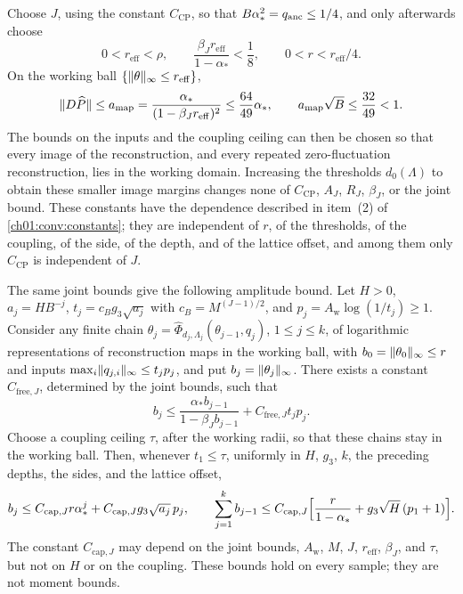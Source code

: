 \begin{lemma}
Choose $J$, using the constant $C_{\mathrm{CP}}$, so that $B\alpha_*^2=q_{\mathrm{anc}}\le1/4$, and only afterwards choose
\[
 0<r_{\mathrm{eff}}<\rho,\qquad \frac{\beta_Jr_{\mathrm{eff}}}{1-\alpha_*}<\frac18,\qquad 0<r<r_{\mathrm{eff}}/4 .
\]
On the working ball $\{\lVert \theta\rVert_\infty\le r_{\mathrm{eff}}\}$,
\[
 \lVert D\widehat P\rVert\le a_{\mathrm{map}}=\frac{\alpha_*}{(1-\beta_Jr_{\mathrm{eff}})^2}\le\frac{64}{49}\alpha_*,\qquad
 a_{\mathrm{map}}\sqrt B\le\frac{32}{49}<1 .
\]
The bounds on the inputs and the coupling ceiling can then be chosen so that every image of the reconstruction, and every repeated zero-fluctuation reconstruction, lies in the working domain. Increasing the thresholds $d_0(\Lambda)$ to obtain these smaller image margins changes none of $C_{\mathrm{CP}}$, $A_J$, $R_J$, $\beta_J$, or the joint bound. These constants have the dependence described in item~(2) of \cref{ch01:conv:constants}; they are independent of $r$, of the thresholds, of the coupling, of the side, of the depth, and of the lattice offset, and among them only $C_{\mathrm{CP}}$ is independent of $J$.

The same joint bounds give the following amplitude bound. Let $H>0$, $a_j=HB^{-j}$, $t_j=c_Bg_3\sqrt{a_j}$ with $c_B=M^{(J-1)/2}$, and $p_j=A_{\mathrm w}\log(1/t_j)\ge1$. Consider any finite chain $\theta_j=\widehat\Phi_{d_j,\Lambda_j}(\theta_{j-1},q_j)$, $1\le j\le k$, of logarithmic representations of reconstruction maps in the working ball, with $b_0=\lVert \theta_0\rVert_\infty\le r$ and inputs $\max_i\lVert q_{j,i}\rVert_\infty\le t_jp_j$, and put $b_j=\lVert \theta_j\rVert_\infty$. There exists a constant $C_{\mathrm{free},J}$, determined by the joint bounds, such that
\[
 b_j\le\frac{\alpha_*b_{j-1}}{1-\beta_Jb_{j-1}}+C_{\mathrm{free},J}t_jp_j .
\]
Choose a coupling ceiling $\tau$, after the working radii, so that these chains stay in the working ball. Then, whenever $t_1\le\tau$, uniformly in $H$, $g_3$, $k$, the preceding depths, the sides, and the lattice offset,
\[
 b_j\le C_{\mathrm{cap},J}r\alpha_*^j+C_{\mathrm{cap},J}g_3\sqrt{a_j}\,p_j,\qquad
 \sum_{j=1}^kb_{j-1}\le C_{\mathrm{cap},J}\Bigl[\frac r{1-\alpha_*}+g_3\sqrt H\,(p_1+1)\Bigr].
\]
The constant $C_{\mathrm{cap},J}$ may depend on the joint bounds, $A_{\mathrm w}$, $M$, $J$, $r_{\mathrm{eff}}$, $\beta_J$, and $\tau$, but not on $H$ or on the coupling. These bounds hold on every sample; they are not moment bounds.
\end{lemma}

